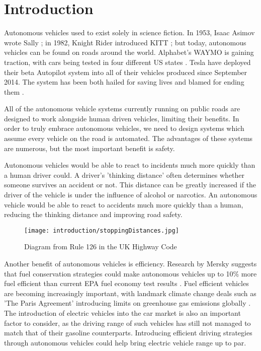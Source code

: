 \chapter{Introduction}
\label{cha:Introduction}

Autonomous vehicles used to exist solely in science fiction. In 1953, Isaac Asimov wrote Sally \citep{Asimov1953}; in 1982, Knight Rider introduced KITT \citep{Kitt1982}; but today, autonomous vehicles can be found on roads around the world. Alphabet's WAYMO is gaining traction, with cars being tested in four different US states \citep{Waymo2016}. Tesla have deployed their beta Autopilot system into all of their vehicles produced since September 2014. The system has been both hailed for saving lives and blamed for ending them \citep{TeslaHospital} \citep{TeslaUnderInvestigation}.

All of the autonomous vehicle systems currently running on public roads are designed to work alongside human driven vehicles, limiting their benefits. In order to truly embrace autonomous vehicles, we need to design systems which assume every vehicle on the road is automated. The advantages of these systems are numerous, but the most important benefit is safety.

Autonomous vehicles would be able to react to incidents much more quickly than a human driver could. A driver's 'thinking distance' often determines whether someone survives an accident or not. This distance can be greatly increased if the driver of the vehicle is under the influence of alcohol or narcotics. An autonomous vehicle would be able to react to accidents much more quickly than a human, reducing the thinking distance and improving road safety.

\begin{figure}[htb]
\texttt{[image: introduction/stoppingDistances.jpg]}
\caption{Diagram from Rule 126 in the UK Highway Code \citep{StoppingDistances}}
\label{fig:StoppingDistances}
\end{figure}

Another benefit of autonomous vehicles is efficiency. Research by Mersky suggests that fuel conservation strategies could make autonomous vehicles up to 10\% more fuel efficient than current EPA fuel economy test results \citep{Mersky2016}. Fuel efficient vehicles are becoming increasingly important, with landmark climate change deals such as 'The Paris Agreement' introducing limits on greenhouse gas emissions globally \citep{Paris2016}. The introduction of electric vehicles into the car market is also an important factor to consider, as the driving range of such vehicles has still not managed to match that of their gasoline counterparts. Introducing efficient driving strategies through autonomous vehicles could help bring electric vehicle range up to par.

